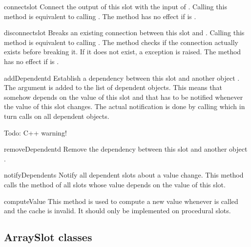 \begin{methoddesc}{connect}{slot}
Connect the output of this slot with the input of .
Calling this method is equivalent to calling .
The method has no effect if  is .
\end{methoddesc}

\begin{methoddesc}{disconnect}{slot}
Breaks an existing connection between this slot and .
Calling this method is equivalent to calling .
The method checks if the connection actually exists before breaking it.
If it does not exist, a  exception is raised.
The method has no effect if  is .
\end{methoddesc}

\begin{methoddesc}{addDependent}{d}
Establish a dependency between this slot and another object .
The argument  is added to the list of dependent objects. This
means that  somehow depends on the value of this slot and that
 has to be notified whenever the value of this slot changes.
The actual notification is done by calling 
which in turn calls  on all dependent objects.

Todo: C++ warning!
\end{methoddesc}

\begin{methoddesc}{removeDependent}{d}
Remove the dependency between this slot and another object .
\end{methoddesc}

\begin{methoddesc}{notifyDependents}{}
Notify all dependent slots about a value change. This method calls the
 method of all slots whose value depends on the 
value of this slot.
\end{methoddesc}

\begin{methoddesc}{computeValue}{}
This method is used to compute a new value whenever  is
called and the cache is invalid. It should only be implemented on
procedural slots.
\end{methoddesc}

\subsection{ArraySlot classes}

